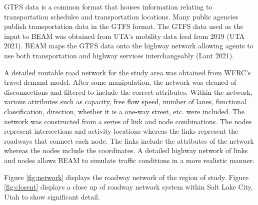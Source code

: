 \documentclass[12pt, oneside, openright]{byuthesis}
\begin{document}
GTFS data is a common format that houses information relating to transportation schedules and transportation locations. Many public agencies publish transportation data in the GTFS format. The GTFS data used as the input to BEAM was obtained from UTA's mobility data feed from 2019 (UTA 2021). BEAM maps the GTFS data onto the highway network allowing agents to use both transportation and highway services interchangeably (Lant 2021).

A detailed routable road network for the study area was obtained from WFRC's travel demand model. After some manipulation, the network was cleaned of disconnections and filtered to include the correct attributes. Within the network, various attributes such as capacity, free flow speed, number of lanes, functional classification, direction, whether it is a one-way street, etc. were included. The network was constructed from a series of link and node combinations. The nodes represent intersections and activity locations whereas the links represent the roadways that connect each node. The links include the attributes of the network whereas the nodes include the coordinates. A detailed highway network of links and nodes allows BEAM to simulate traffic conditions in a more realistic manner.

Figure \ref{fig:network} displays the roadway network of the region of study. Figure \ref{fig:closent} displays a close up of roadway network system within Salt Lake City, Utah to show significant detail.
\end{document}
